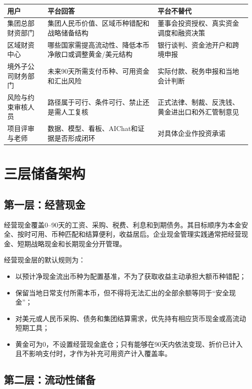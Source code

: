 \documentclass[UTF8,fontset=windows,12pt,openany]{ctexbook}
\begin{document}
\begin{longtable}{p{3.1cm}p{5.0cm}p{5.2cm}}
\toprule
\textbf{用户} & \textbf{平台回答} & \textbf{平台不替代}\\
\midrule
集团总部财资部门 & 集团人民币价值、区域币种错配和战略储备结构 & 董事会投资授权、真实资金调度和融资决策\\
区域财资中心 & 哪些国家需提高流动性、降低本币净敞口或调整黄金/美元结构 & 银行谈判、资金池开户和跨境申报\\
境外子公司财务部门 & 未来90天所需支付币种、可用资金和汇出风险 & 实际付款、税务申报和当地会计判断\\
风险与约束审核人员 & 路径属于可行、条件可行、禁止还是需人工复核 & 正式法律、制裁、反洗钱、黄金进出口和外汇管制意见\\
项目评审与老师 & 数据、模型、看板、AIChat和证据是否形成闭环 & 对具体企业作投资承诺\\
\bottomrule
\end{longtable}

\chapter{三层储备架构}

\section{第一层：经营现金}

经营现金覆盖0--90天的工资、采购、税费、利息和到期债务。其目标顺序为本金安全、按时可用、币种匹配和结算便利，收益居后。企业现金管理实践通常把经营现金、短期战略现金和长期现金分开管理\cite{afpcash}。

经营现金层的默认规则为：

\begin{itemize}
  \item 以预计净现金流出币种为配置基准，不为了获取收益主动承担大额币种错配；
  \item 保留当地日常支付所需本币，但不得将无法汇出的全部余额等同于“安全现金”；
  \item 对美元或人民币采购、债务和集团结算需求，优先持有相应货币现金或高流动短期工具；
  \item 黄金可为0，不设置经营现金底仓；只有能够在90天内依法变现、折价已计入且不影响支付时，才作为补充可用资产计入覆盖率。
\end{itemize}

\section{第二层：流动性储备}
\end{document}
